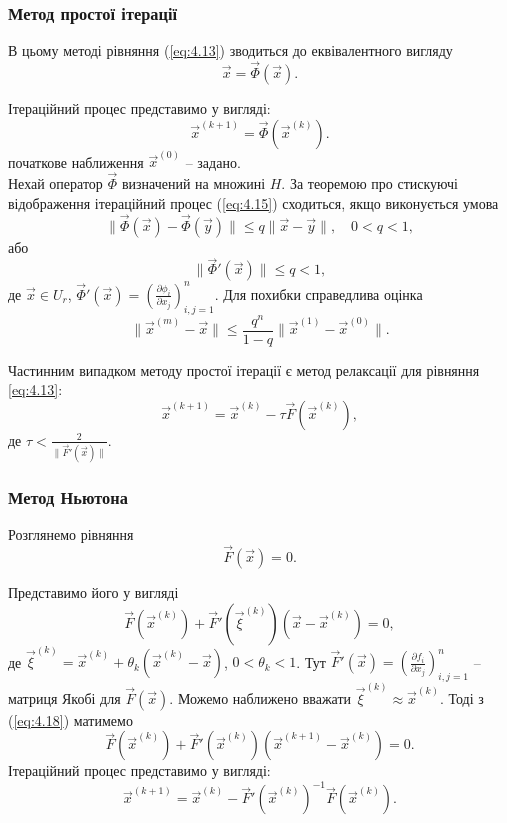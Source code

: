 \subsubsection{Метод простої ітерації}

В цьому методі рівняння (\ref{eq:4.13}) зводиться до еквівалентного вигляду
\begin{equation}
	\label{eq:4.14}
	\vec x = \vec \Phi(\vec x).
\end{equation}

Ітераційний процес представимо у вигляді:
\begin{equation}
	\label{eq:4.15}
	\vec x^{(k+1)} = \vec \Phi(\vec x^{(k)}).
\end{equation}
початкове наближення $\vec x^{(0)}$ -- задано. \\

Нехай оператор $\vec \Phi$ визначений на множині $H$. За теоремою про стискуючі відображення ітераційний процес (\ref{eq:4.15}) сходиться, якщо виконується умова
\begin{equation}
	\label{eq:4.16}
	\| \vec \Phi(\vec x) - \vec \Phi(\vec y) \| \le q \|\vec x - \vec y\|, \quad 0 < q < 1, 
\end{equation}
або
\begin{equation}
	\label{eq:4.17}
	\| \vec \Phi'(\vec x)\| \le q < 1, 
\end{equation}
де $\vec x\in U_r$, $\vec \Phi'(\vec x) = \left(\frac{\partial \phi_i}{\partial x_j}\right)_{i,j=1}^n$. Для похибки справедлива оцінка
\[ \| \vec x^{(m)} - \vec x\| \le \dfrac{q^n}{1 - q} \|\vec x^{(1)} - \vec x^{(0)}\|.\]

Частинним випадком методу простої ітерації є метод релаксації для рівняння \ref{eq:4.13}:
\[ \vec x^{(k+1)} = \vec x^{(k)} - \tau \vec F(\vec x^{(k)}), \] де $\tau < \frac{2}{\|\vec F'(\vec x)\|}$.

\subsubsection{Метод Ньютона}

Розглянемо рівняння
\[ \vec F(\vec x) = 0. \]

Представимо його у вигляді
\begin{equation}
	\label{eq:4.18}
	\vec F(\vec x^{(k)}) + \vec F'(\vec \xi^{(k)}) (\vec x - \vec x^{(k)}) = 0,
\end{equation}
де $\vec \xi^{(k)} = \vec x^{(k)} + \theta_k (\vec x^{(k)} - \vec x)$, $0 < \theta_k < 1$. Тут  $\vec F'(\vec x) = \left(\frac{\partial f_i}{\partial x_j}\right)_{i,j=1}^n$ -- матриця Якобі для $\vec F(\vec x)$. Можемо наближено вважати $\vec \xi^{(k)} \approx \vec x^{(k)}$. Тоді з (\ref{eq:4.18}) матимемо
\begin{equation}
	\label{eq:4.19}
	\vec F(\vec x^{(k)}) + \vec F'(\vec x^{(k)}) (\vec x^{(k+1)} - \vec x^{(k)}) = 0.
\end{equation}
Ітераційний процес представимо у вигляді:
\begin{equation}
	\label{eq:4.20}
	\vec x^{(k+1)} = \vec x^{(k)} - \vec F'(\vec x^{(k)})^{-1} \vec F(\vec x^{(k)}). 
\end{equation}

